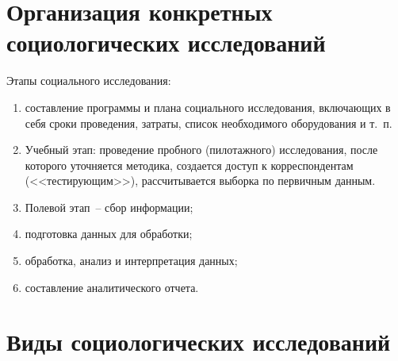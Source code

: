   \section{Организация конкретных социологических исследований}

    Этапы социального исследования:
    \begin{enumerate}
      \item составление программы и плана социального исследования, включающих в
        себя сроки проведения, затраты, список необходимого оборудования и т.~п.
      \item Учебный этап: проведение пробного (пилотажного) исследования, после
        которого уточняется методика, создается доступ к корреспондентам
        (<<тестирующим>>), рассчитывается выборка по первичным данным.
      \item Полевой этап~-- сбор информации;
      \item подготовка данных для обработки;
      \item обработка, анализ и интерпретация данных;
      \item составление аналитического отчета.
    \end{enumerate}

  \section{Виды социологических исследований}

